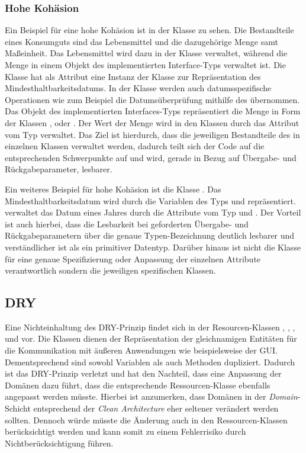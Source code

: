 \subsubsection*{Hohe Kohäsion}
Ein Beispiel für eine hohe Kohäsion ist in der Klasse  zu sehen.
Die Bestandteile eines Konsumguts sind das Lebensmittel und die dazugehörige Menge samt Maßeinheit.
Das Lebensmittel wird dazu in der Klasse  verwaltet, während die Menge in einem Objekt des implementierten Interface-Typs  verwaltet ist.
Die Klasse  hat als Attribut eine Instanz der Klasse  zur Repräsentation des Mindesthaltbarkeitsdatums.
In der Klasse  werden auch datumsspezifische Operationen wie zum Beispiel die Datumsüberprüfung mithilfe des  übernommen.
Das Objekt des implementierten Interfaces-Typs  repräsentiert die Menge in Form der Klassen ,  oder .
Der Wert der Menge wird in den Klassen durch das Attribut vom Typ  verwaltet.
Das Ziel ist hierdurch, dass die jeweiligen Bestandteile des  in einzelnen Klassen verwaltet werden, dadurch teilt sich der Code auf die entsprechenden Schwerpunkte auf und wird, gerade in Bezug auf Übergabe- und Rückgabeparameter, lesbarer.


Ein weiteres Beispiel für hohe Kohäsion ist die Klasse .
Das Mindesthaltbarkeitsdatum wird durch die Variablen des Typs  und  repräsentiert.
 verwaltet das Datum eines Jahres durch die Attribute vom Typ  und .
Der Vorteil ist auch hierbei, dass die Lesbarkeit bei geforderten Übergabe- und Rückgabeparametern über die genaue Typen-Bezeichnung deutlich lesbarer und verständlicher ist als ein primitiver Datentyp.
Darüber hinaus ist nicht die Klasse  für eine genaue Spezifizierung oder Anpassung der einzelnen Attribute verantwortlich sondern die jeweiligen spezifischen Klassen.


\subsection{\ac{DRY}}

Eine Nichteinhaltung des \ac{DRY}-Prinzip findet sich in der Resourcen-Klassen , , ,  und  vor.
Die Klassen dienen der Repräsentation der gleichnamigen Entitäten für die Kommunikation mit äußeren Anwendungen wie beispielsweise der \ac{GUI}.
Dementsprechend sind sowohl Variablen als auch Methoden dupliziert.
Dadurch ist das \ac{DRY}-Prinzip verletzt und hat den Nachteil, dass eine Anpassung der Domänen dazu führt, dass die entsprechende Ressourcen-Klasse ebenfalls angepasst werden müsste.
Hierbei ist anzumerken, dass Domänen in der \textit{Domain}-Schicht entsprechend der \textit{Clean Architecture} eher seltener verändert werden sollten.
Dennoch würde müsste die Änderung auch in den Ressourcen-Klassen berücksichtigt werden und kann somit zu einem Fehlerrisiko durch Nichtberücksichtigung führen.
